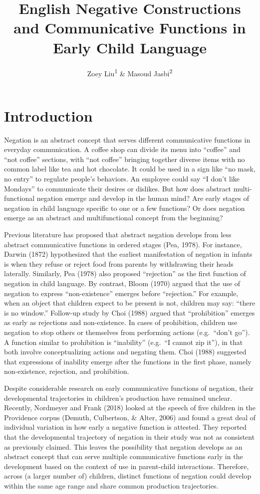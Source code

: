 \documentclass[
  english,
  man,floatsintext]{apa6}
\title{English Negative Constructions and Communicative Functions in Early Child Language}
\author{Zoey Liu\textsuperscript{1} \& Masoud Jasbi\textsuperscript{2}}
\date{}
\affiliation{\vspace{0.5cm}\textsuperscript{1} Boston College\\\textsuperscript{2} UC Davis}
\begin{document}
\maketitle

\hypertarget{introduction}{%
\section{Introduction}\label{introduction}}

Negation is an abstract concept that serves different communicative functions in everyday communication. A coffee shop can divide its menu into ``coffee'' and ``not coffee'' sections, with ``not coffee'' bringing together diverse items with no common label like tea and hot chocolate. It could be used in a sign like ``no mask, no entry'' to regulate people's behaviors. An employee could say ``I don't like Mondays'' to communicate their desires or dislikes. But how does abstract multi-functional negation emerge and develop in the human mind? Are early stages of negation in child language specific to one or a few functions? Or does negation emerge as an abstract and multifunctional concept from the beginning?

Previous literature has proposed that abstract negation develops from less abstract communicative functions in ordered stages (Pea, 1978). For instance, Darwin (1872) hypothesized that the earliest manifestation of negation in infants is when they refuse or reject food from parents by withdrawing their heads laterally. Similarly, Pea (1978) also proposed ``rejection'' as the first function of negation in child language. By contrast, Bloom (1970) argued that the use of negation to express ``non-existence'' emerges before ``rejection.'' For example, when an object that children expect to be present is not, children may say: ``there is no window.'' Follow-up study by Choi (1988) argued that ``prohibition'' emerges as early as rejections and non-existence. In cases of prohibition, children use negation to stop others or themselves from performing actions (e.g.~``don't go''). A function similar to prohibition is ``inability'' (e.g.~``I cannot zip it''), in that both involve conceptualizing actions and negating them. Choi (1988) suggested that expressions of inability emerge after the functions in the first phase, namely non-existence, rejection, and prohibition.

Despite considerable research on early communicative functions of negation, their developmental trajectories in children's production have remained unclear. Recently, Nordmeyer and Frank (2018) looked at the speech of five children in the Providence corpus (Demuth, Culbertson, \& Alter, 2006) and found a great deal of individual variation in how early a negative function is attested. They reported that the
developmental trajectory of negation in their study was not as consistent as previously claimed. This leaves the possibility that negation develops as an abstract concept that can serve multiple communicative functions early in the development based on the context of use in parent-child interactions. Therefore, across (a larger number of) children, distinct functions of negation could develop within the same age range and share common production trajectories.
\end{document}
